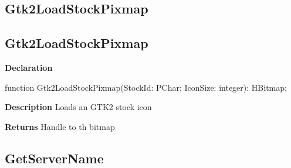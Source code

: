 \documentclass{report}
\newif\ifpdf
\begin{document}
\subsection*{\large{\textbf{Gtk2LoadStockPixmap}}\normalsize\hspace{1ex}\hrulefill}
\else
\subsection*{Gtk2LoadStockPixmap}
\fi
\label{utilities-Gtk2LoadStockPixmap}
\begin{list}{}{
\setlength{\itemindent}{0cm}
\setlength{\listparindent}{0cm}
\setlength{\leftmargin}{\evensidemargin}
\addtolength{\leftmargin}{\tmplength}
\settowidth{\labelsep}{X}
\addtolength{\leftmargin}{\labelsep}
\setlength{\labelwidth}{\tmplength}
}
\item[\textbf{Declaration}\hfill]
\ifpdf
\begin{flushleft}
\fi
\begin{ttfamily}
function Gtk2LoadStockPixmap(StockId: PChar; IconSize: integer): HBitmap;\end{ttfamily}

\ifpdf
\end{flushleft}
\fi

\par
\item[\textbf{Description}]
Loads an GTK2 stock icon \par
\item[\textbf{Returns}]Handle to th bitmap


\end{list}
\ifpdf
\subsection*{\large{\textbf{GetServerName}}\normalsize\hspace{1ex}\hrulefill}
\else
\end{document}
